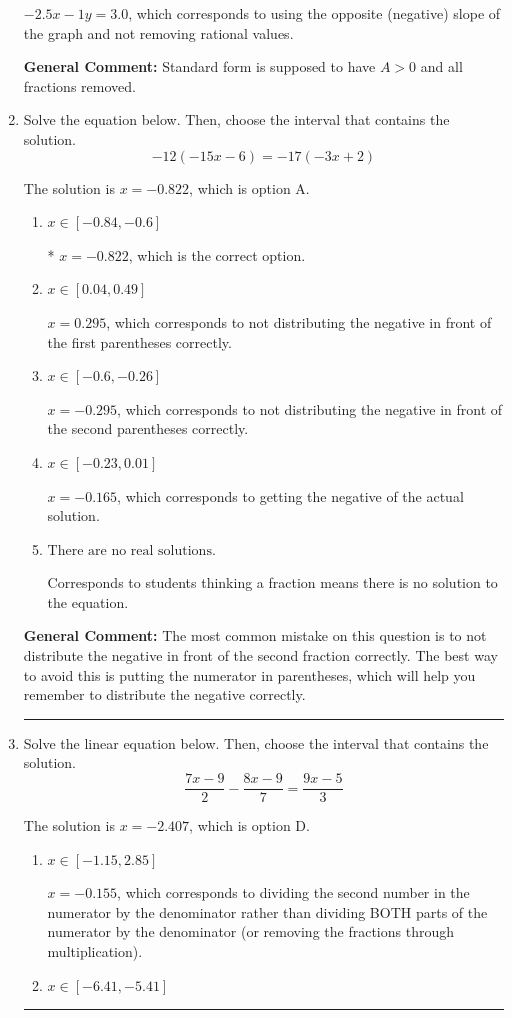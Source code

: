 \documentclass{extbook}[14pt]
\newcommand{\litem}[1]{\item #1

\rule{\textwidth}{0.4pt}}
\begin{document}
\begin{enumerate}
{\begin{enumerate}[label=\Alph*.]
 $-2.5x - 1y = 3.0$, which corresponds to using the opposite (negative) slope of the graph and not removing rational values.
\end{enumerate}

\textbf{General Comment:} Standard form is supposed to have $A > 0$ and all fractions removed.
}
\litem{
Solve the equation below. Then, choose the interval that contains the solution.
\[ -12(-15x -6) = -17(-3x + 2) \]

The solution is \( x = -0.822 \), which is option A.\begin{enumerate}[label=\Alph*.]
\item \( x \in [-0.84, -0.6] \)

* $x = -0.822$, which is the correct option.
\item \( x \in [0.04, 0.49] \)

$x = 0.295$, which corresponds to not distributing the negative in front of the first parentheses correctly.
\item \( x \in [-0.6, -0.26] \)

$x = -0.295$, which corresponds to not distributing the negative in front of the second parentheses correctly.
\item \( x \in [-0.23, 0.01] \)

$x = -0.165$, which corresponds to getting the negative of the actual solution.
\item \( \text{There are no real solutions.} \)

Corresponds to students thinking a fraction means there is no solution to the equation.
\end{enumerate}

\textbf{General Comment:} The most common mistake on this question is to not distribute the negative in front of the second fraction correctly. The best way to avoid this is putting the numerator in parentheses, which will help you remember to distribute the negative correctly.
}
\litem{
Solve the linear equation below. Then, choose the interval that contains the solution.
\[ \frac{7x -9}{2} - \frac{8x -9}{7} = \frac{9x -5}{3} \]

The solution is \( x = -2.407 \), which is option D.\begin{enumerate}[label=\Alph*.]
\item \( x \in [-1.15, 2.85] \)

 $x = -0.155$, which corresponds to dividing the second number in the numerator by the denominator rather than dividing BOTH parts of the numerator by the denominator (or removing the fractions through multiplication).
\item \( x \in [-6.41, -5.41] \)


\end{enumerate}}
\end{enumerate}
\end{document}
